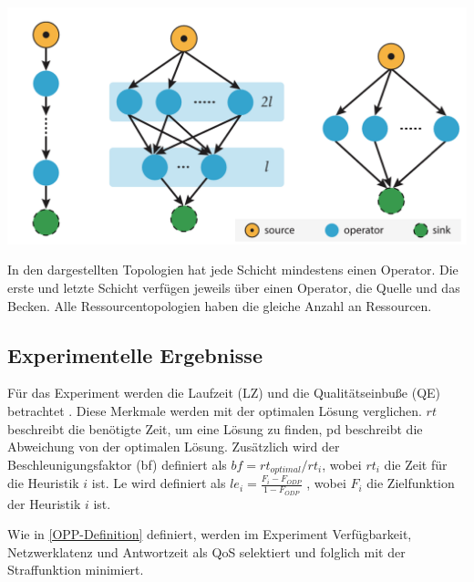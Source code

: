 \documentclass{article}
\begin{document}
\noindent
\begin{minipage}{0.45\textwidth}
    \includegraphics[width=0.75\linewidth]{res/topologies.png}
\label{topologies}
\end{minipage}
\hspace{10pt}
\begin{minipage}{0.5\textwidth}
    In den dargestellten Topologien hat jede Schicht mindestens einen Operator. 
    Die erste und letzte Schicht verfügen jeweils über einen Operator, die Quelle und das Becken. 
    Alle Ressourcentopologien haben die gleiche Anzahl an Ressourcen.
\end{minipage}



\subsection{Experimentelle Ergebnisse}

Für das Experiment werden die Laufzeit (LZ) und die Qualitätseinbuße (QE) betrachtet \cite{efficient-operator-placement}.
Diese Merkmale werden mit der optimalen Lösung verglichen. $rt$ beschreibt die benötigte Zeit, 
um eine Lösung zu finden, pd beschreibt die Abweichung von der optimalen Lösung. 
Zusätzlich wird der Beschleunigungsfaktor (bf) definiert als $bf = rt_{optimal} / rt_i$, wobei $rt_i$ die Zeit für die Heuristik $i$ ist.
Le wird definiert als $le_i = \frac{F_i - F_{ODP}}{1 - F_{ODP}}$ \cite{efficient-operator-placement}, 
wobei $F_i$ die Zielfunktion der Heuristik $i$ ist.

Wie in \ref{OPP-Definition} definiert, werden im Experiment Verfügbarkeit, 
Netzwerklatenz und Antwortzeit als QoS selektiert und folglich mit der Straffunktion minimiert. 


\end{document}

